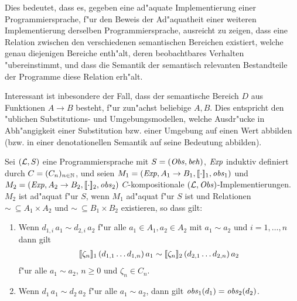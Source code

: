 \documentclass[12pt,a4paper]{article}
\begin{document}
Dies bedeutet, dass es, gegeben eine ad"aquate Implementierung einer Programmiersprache, f"ur den
Beweis der Ad"aquatheit einer weiteren Implementierung derselben Programmiersprache, ausreicht zu
zeigen, dass eine Relation zwischen den verschiedenen semantischen Bereichen existiert, welche
genau diejenigen Bereiche enth"alt, deren beobachtbares Verhalten "ubereinstimmt, und dass die
Semantik der semantisch relevanten Bestandteile der Programme diese Relation erh"alt.

Interessant ist inbesondere der Fall, dass der semantische Bereich $D$ aus Funktionen $A \to B$ besteht,
f"ur zun"achst beliebige $A,B$. Dies entspricht den "ublichen Substitutions- und Umgebungsmodellen, welche
Ausdr"ucke in Abh"angigkeit einer Substitution bzw. einer Umgebung auf einen Wert abbilden (bzw. in einer
denotationellen Semantik auf seine Bedeutung abbilden).

\begin{theorem}
  Sei $(\mathcal L,S)$ eine Programmiersprache mit $S = (\mathit{Obs},\mathit{beh})$, $\mathit{Exp}$ induktiv definiert durch
  $C = (C_n)_{n\in\mathbb N}$, und seien $M_1 = (\mathit{Exp},A_1 \to B_1,[\![\cdot]\!]_1,\mathit{obs}_1)$ und
  $M_2 = (\mathit{Exp},A_2 \to B_2,[\![\cdot]\!]_2,\mathit{obs}_2)$ $C$-kompositionale $(\mathcal L,\mathit{Obs})$-Implementierungen.
  $M_2$ ist ad"aquat f"ur $S$, wenn $M_1$ ad"aquat f"ur $S$ ist und Relationen
  $\sim\ \subseteq A_1 \times A_2$ und $\sim\ \subseteq B_1 \times B_2$ existieren, so dass gilt:
  \begin{enumerate}
  \item Wenn $d_{1,i}\,a_1 \sim d_{2,i}\,a_2$ f"ur alle $a_1 \in A_1,a_2 \in A_2$ mit
    $a_1 \sim a_2$ und $i = 1,\ldots,n$ dann gilt
    \[\begin{array}{c}
      [\![\zeta_n]\!]_1\,(d_{1,1} \ldots d_{1,n})\,a_1
      \sim
      [\![\zeta_n]\!]_2\,(d_{2,1} \ldots d_{2,n})\,a_2
    \end{array}\]
    f"ur alle $a_1 \sim a_2$, $n \ge 0$ und $\zeta_n \in C_n$.
  \item Wenn $d_1\,a_1 \sim d_2\,a_2$ f"ur alle $a_1 \sim a_2$, dann gilt
    $\mathit{obs}_1(d_1) = \mathit{obs}_2(d_2)$.
  \end{enumerate}
\end{theorem}
\end{document}
